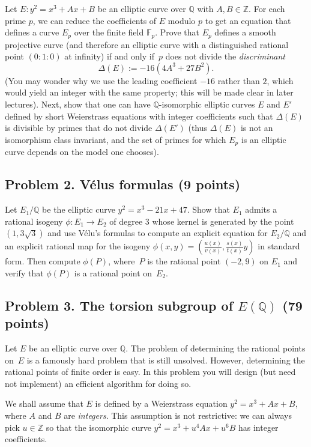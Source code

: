 \documentclass[11pt]{article}
\newcommand{\Fp}{\mathbb{F}_p}
\newcommand{\Q}{\mathbb{Q}}
\newcommand{\Z}{\mathbb{Z}}
\begin{document}
Let $E\colon y^2=x^3+Ax+B$ be an elliptic curve over $\Q$ with $A,B\in\Z$.
For each prime $p$, we can reduce the coefficients of $E$ modulo $p$ to get an equation that defines a curve $E_p$ over the finite field $\Fp$.  Prove that $E_p$ defines a smooth projective curve (and therefore an elliptic curve with a distinguished rational point $(0:1:0)$ at infinity) if and only if~$p$ does not divide the \emph{discriminant}
\[
\Delta(E):=-16(4A^3+27B^2).
\]
(You may wonder why we use the leading coefficient $-16$ rather than $2$, which would yield an integer with the same property; this will be made clear in later lectures).
Next, show that one can have $\Q$-isomorphic elliptic curves $E$ and $E'$ defined by short Weierstrass equations with integer coefficients such that $\Delta(E)$ is divisible by primes that do not divide $\Delta(E')$ (thus $\Delta(E)$ is not an isomorphism class invariant, and the set of primes for which $E_p$ is an elliptic curve depends on the model one chooses).

\subsection*{Problem 2. V\'elus formulas (9 points)}
Let $E_1/\Q$ be the elliptic curve  $y^2=x^3-21x+47$.  Show that $E_1$ admits a rational isogeny $\phi\colon E_1\to E_2$ of degree 3 whose kernel is generated by the point $(1,3\sqrt{3})$ and use V\'elu's formulas to compute an explicit equation for $E_2/\Q$ and an explicit rational map for the isogeny $\phi(x,y)=\left(\frac{u(x)}{v(x)},\frac{s(x)}{t(x)}y\right)$ in standard form.  Then compute $\phi(P)$, where~$P$ is the rational point $(-2,9)$ on $E_1$ and verify that $\phi(P)$ is a rational point on~$E_2$.

\subsection*{Problem 3. The torsion subgroup of $E(\Q)$ (79 points)}

Let $E$ be an elliptic curve over $\Q$.
The problem of determining the rational points on~$E$ is a famously hard problem that is still unsolved.
However, determining the rational points of finite order is easy.
In this problem you will design (but need not implement) an efficient algorithm for doing so.

We shall assume that $E$ is defined by a Weierstrass equation $y^2=x^3+Ax+B$, where $A$ and $B$ are \emph{integers}.
This assumption is not restrictive: we can always pick $u\in\Z$ so that the isomorphic curve $y^2=x^3+u^4Ax+u^6B$ has integer coefficients.
\end{document}
